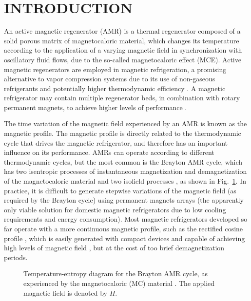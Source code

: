 \documentclass[draft]{svjour3}
\begin{document}
\section{INTRODUCTION}
\label{sec:introduction}

An active magnetic regenerator (AMR)  is a thermal regenerator composed of a solid porous matrix of magnetocaloric material, which changes its temperature according to the application of a varying magnetic field in synchronization with oscillatory fluid flows, due to the so-called magnetocaloric effect (MCE). Active magnetic regenerators are employed in magnetic refrigeration, a promising alternative to vapor compression systems due to its use of non-gaseous refrigerants and potentially higher  thermodynamic efficiency \cite{bib:trevizoli}. A magnetic refrigerator may contain multiple regenerator beds, in combination with rotary permanent magnets, to achieve higher levels of performance \cite{bib:trevizoli16_pump}.

The time variation of the magnetic field experienced by an AMR is known as the magnetic profile. The magnetic profile is directly related to the thermodynamic cycle that drives the magnetic refrigerator, and therefore has an important influence on its performance. AMRs can operate according to different thermodynamic cycles, but the most common is the Brayton AMR cycle, which has two isentropic processes of instantaneous magnetization and demagnetization of the magnetocaloric material and two isofield processes \cite{bib:kitanovski}, as shown in Fig.~\ref{fig:brayton}. In practice, it is difficult to generate  stepwise variations of the magnetic field (as required by  the Brayton cycle) using permanent magnets arrays (the apparently only viable solution for domestic magnetic refrigerators due to low cooling requirements and energy consumption). Most magnetic refrigerators developed so far operate with a more continuous magnetic profile, such as the rectified cosine profile \cite{bib:tura-rowe-amr,bib:arnold14_desig,bib:trevizoli15_desig_halbac}, which is easily generated with compact devices and capable of achieving high levels of magnetic field \cite{bib:trevizoli16_pump}, but at the cost of  too brief demagnetization periods.

\begin{figure}[!ht]
  \centering
  \caption{Temperature-entropy diagram for the Brayton AMR cycle, as experienced by the magnetocaloric (MC)  material \cite{bib:kitanovski}. The applied magnetic field is denoted by $H$.}
  \label{fig:brayton}
\end{figure}
\end{document}
